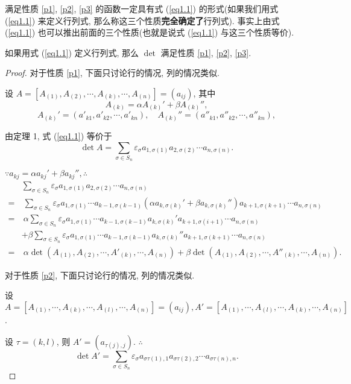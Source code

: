 \documentclass{ctexart}
\begin{document}
满足性质 \ref{p1}, \ref{p2}, \ref{p3} 的函数一定具有式 (\ref{eq1.1}) 的形式(如果我们用式 (\ref{eq1.1}) 来定义行列式, 那么称这三个性质\textbf{完全确定了}行列式). 事实上由式 (\ref{eq1.1}) 也可以推出前面的三个性质(也就是说式 (\ref{eq1.1}) 与这三个性质等价).
\begin{theorem}
    如果用式 (\ref{eq1.1}) 定义行列式, 那么 $\det$ 满足性质 \ref{p1}, \ref{p2}, \ref{p3}.
\end{theorem}
\begin{proof}
    对于性质 \ref{p1}, 下面只讨论行的情况, 列的情况类似.

    设 $A=[A_{(1)},A_{(2)},\cdots,A_{(k)},\cdots,A_{(n)}]=(a_{ij})$, 其中
    \[A_{(k)}=\alpha A_{(k)}'+\beta A_{(k)}'',\]
    \[A_{(k)}'=(a'_{k1},a'_{k2},\cdots,a'_{kn}),\quad A_{(k)}''=(a''_{k1},a''_{k2},\cdots,a''_{kn}),\]

    由定理 1, 式 (\ref{eq1.1}) 等价于
    \[\det A=\sum\limits_{\sigma\in S_n}\varepsilon_\sigma a_{1,\sigma(1)}a_{2,\sigma(2)}\cdots a_{n,\sigma(n)}.\]

    $\because a_{kj}=\alpha a_{kj}'+\beta a_{kj}'',\therefore$
    \begin{align*}
        & \sum\limits_{\sigma\in S_n}\varepsilon_\sigma a_{1,\sigma(1)}a_{2,\sigma(2)}\cdots a_{n,\sigma(n)} \\
        = & \ \sum\limits_{\sigma\in S_n}\varepsilon_\sigma a_{1,\sigma(1)}\cdots a_{k-1,\sigma(k-1)}(\alpha a_{k,\sigma(k)}'+\beta a_{k,\sigma(k)}'')a_{k+1,\sigma(k+1)}\cdots a_{n,\sigma(n)} \\
        = & \ \alpha\sum\limits_{\sigma\in S_n}\varepsilon_\sigma a_{1,\sigma(1)}\cdots a_{k-1,\sigma(k-1)}a_{k,\sigma(k)}'a_{k+1,\sigma(i+1)}\cdots a_{n,\sigma(n)} \\
        & +\beta\sum\limits_{\sigma\in S_n}\varepsilon_\sigma a_{1,\sigma(1)}\cdots a_{k-1,\sigma(k-1)}a_{k,\sigma(k)}''a_{k+1,\sigma(k+1)}\cdots a_{n,\sigma(n)} \\
        = & \ \alpha\det(A_{(1)},A_{(2)},\cdots,A'_{(k)},\cdots,A_{(n)})+\beta\det(A_{(1)},A_{(2)},\cdots,A''_{(k)},\cdots,A_{(n)}).
    \end{align*}

    对于性质 \ref{p2}, 下面只讨论行的情况, 列的情况类似.

    设 $A=[A_{(1)},\cdots,A_{(k)},\cdots,A_{(l)},\cdots,A_{(n)}]=(a_{ij}),A'=[A_{(1)},\cdots,A_{(l)},\cdots,A_{(k)},\cdots,A_{(n)}]$.

    设 $\tau=(k,l)$, 则 $A'=(a_{\tau(j),j})$. $\therefore$
    \[\det A'=\sum\limits_{\sigma\in S_n}\varepsilon_\sigma a_{\sigma\tau(1),1}a_{\sigma\tau(2),2}\cdots a_{\sigma\tau(n),n}.\]


\end{proof}
\end{document}

